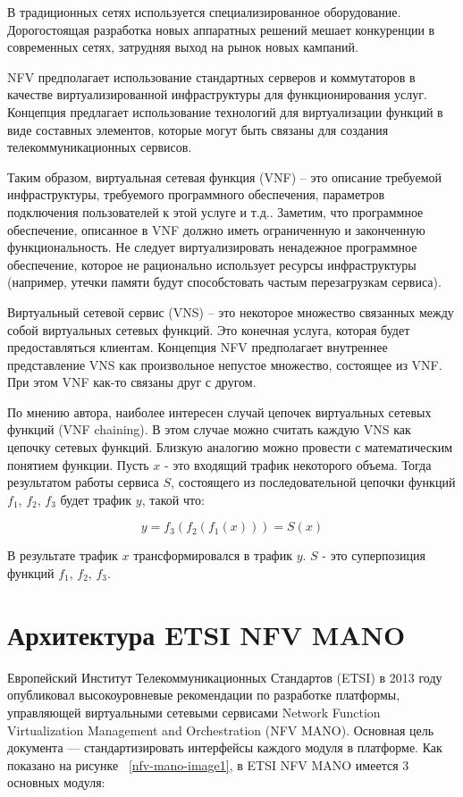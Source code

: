 \documentclass[oneside,final,14pt,a4paper]{extreport}
\begin{document}
В традиционных сетях используется специализированное оборудование. Дорогостоящая разработка новых аппаратных решений мешает конкуренции в современных сетях, затрудняя выход на рынок новых кампаний.

NFV предполагает использование стандартных серверов и коммутаторов в качестве виртуализированной инфраструктуры для функционирования услуг. Концепция предлагает использование технологий для виртуализации функций в виде составных элементов, которые могут быть связаны для создания телекоммуникационных сервисов.

Таким образом, виртуальная сетевая функция (VNF) -- это описание требуемой инфраструктуры, требуемого программного обеспечения, параметров подключения пользователей к этой услуге и т.д.. Заметим, что программное обеспечение, описанное в VNF должно иметь ограниченную и законченную функциональность. Не следует виртуализировать ненадежное программное обеспечение, которое не рационально использует ресурсы инфраструктуры (например, утечки памяти будут способстовать частым перезагрузкам сервиса).

Виртуальный сетевой сервис (VNS) -- это некоторое множество связанных между собой виртуальных сетевых функций. Это конечная услуга, которая будет предоставляться клиентам. Концепция NFV предполагает внутреннее представление VNS как произвольное непустое множество, состоящее из VNF. При этом VNF как-то связаны друг с другом.

По мнению автора, наиболее интересен случай цепочек виртуальных сетевых функций (VNF chaining). В этом случае можно считать каждую VNS как цепочку сетевых функций. Близкую аналогию можно провести с математическим понятием функции. Пусть $x$ - это входящий трафик некоторого объема. Тогда результатом работы сервиса $S$, состоящего из последовательной цепочки функций $f_{1}$, $f_{2}$, $f_{3}$ будет трафик $y$, такой что:

\begin{equation}
	\label{eq:service_example}
	y = f_3(f_2(f_1(x))) = S(x)
\end{equation}

В результате трафик $x$ трансформировался в трафик $y$. $S$ - это суперпозиция функций $f_{1}$, $f_{2}$, $f_{3}$.


\section{Архитектура ETSI NFV MANO}
\label{sec:etsi_nfv_mano}
Европейский Институт Телекоммуникационных Стандартов (ETSI) в 2013 году опубликовал высокоуровневые рекомендации по разработке платформы, управляющей виртуальными сетевыми сервисами Network Function Virtualization Management and Orchestration (NFV MANO). Основная цель документа --- стандартизировать интерфейсы каждого модуля в платформе.\cite{nfv-mano-state1} Как показано на рисунке ~\ref{nfv-mano-image1}, в ETSI NFV MANO имеется 3 основных модуля:
\end{document}
